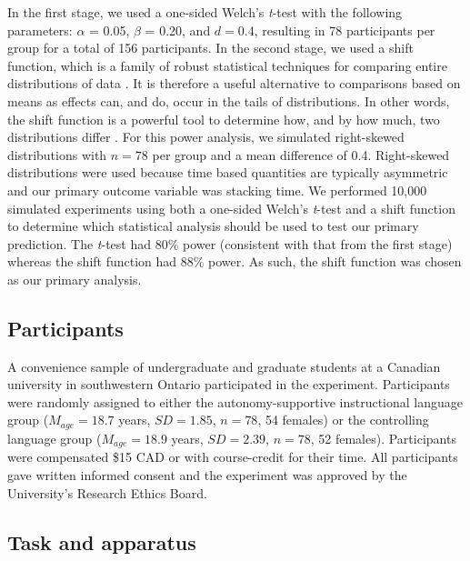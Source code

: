 \documentclass[doc,floatsintext,donotrepeattitle,letterpaper,12pt]{apa7}
\begin{document}
In the first stage, we used a one-sided Welch's \emph{t}-test with the following parameters: $\alpha$ = 0.05, $\beta$ = 0.20, and $d = 0.4$, resulting in 78 participants per group for a total of 156 participants. In the second stage, we used a shift function, which is a family of robust statistical techniques for comparing entire distributions of data \autocite{R-rogme,rousselet2020,wilcox2021,wilcox2023}. It is therefore a useful alternative to comparisons based on means as effects can, and do, occur in the tails of distributions. In other words, the shift function is a powerful tool to determine how, and by how much, two distributions differ \autocite{R-rogme,wilcox2021}. For this power analysis, we simulated right-skewed distributions with $n = 78$ per group and a mean difference of 0.4. Right-skewed distributions were used because time based quantities are typically asymmetric \autocite[see][for a discussion]{rousselet2020} and our primary outcome variable was stacking time. We performed 10,000 simulated experiments using both a one-sided Welch's \emph{t}-test and a shift function to determine which statistical analysis should be used to test our primary prediction. The \emph{t}-test had 80\% power (consistent with that from the first stage) whereas the shift function had 88\% power. As such, the shift function was chosen as our primary analysis.\footnotemark{}

\subsection{Participants}

A convenience sample of undergraduate and graduate students at a Canadian university in southwestern Ontario participated in the experiment. Participants were randomly assigned to either the autonomy-supportive instructional language group ($M_{age} = 18.7$ years, $SD = 1.85$, $n = 78$, 54 females) or the controlling language group ($M_{age} = 18.9$ years, $SD = 2.39$, $n = 78$, 52 females). Participants were compensated \$15 CAD or with course-credit for their time. All participants gave written informed consent and the experiment was approved by the University's Research Ethics Board.

\subsection{Task and apparatus}
\end{document}

